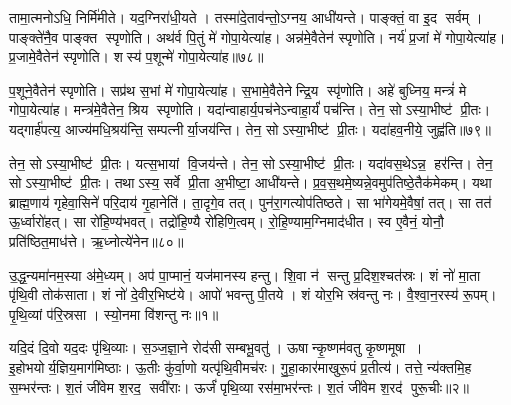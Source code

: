 तामा॒त्मनोऽधि॒ निर्मि॑मीते।
यद॒ग्निरा॑धी॒यते।
तस्मा॑दे॒ताव॑न्तो॒\-ऽग्नय॒ आधी॑यन्ते।
पाङ्क्तं॒ वा इ॒द सर्वम्।
पाङ्क्ते॑नै॒व पाङ्क्त स्पृणोति।
अथ॑र्व पि॒तुं मे॑ गोपा॒येत्या॑ह।
अन्न॑मे॒वैतेन॑ स्पृणोति।
नर्य॑ प्र॒जां मे॑ गोपा॒येत्या॑ह।
प्र॒जामे॒वैतेन॑ स्पृणोति।
शस्य॑ प॒शून्मे॑ गोपा॒येत्या॑ह॥७८॥

प॒शूने॒वैतेन॑ स्पृणोति।
सप्र॑थ स॒भां मे॑ गोपा॒येत्या॑ह।
स॒भामे॒वैतेनेन्द्रि॒य स्पृ॑णोति।
अहे॑ बुध्निय॒ मन्त्रं॑ मे गोपा॒येत्या॑ह।
मन्त्र॑मे॒वैतेन॒ श्रिय स्पृणोति।
यदा॑न्वाहार्य॒पच॑नेऽन्वाहा॒र्यं॑ पच॑न्ति।
तेन॒ सोऽस्या॒भीष्ट॑ प्री॒तः।
यद्गार्\mbox{}ह॑पत्य॒ आज्य॑मधि॒श्रय॑न्ति॒ सम्पत्नीर्या॒जय॑न्ति।
तेन॒ सोऽस्या॒भीष्ट॑ प्री॒तः।
यदा॑हव॒नीये॒ जुह्व॑ति॥७९॥

तेन॒ सोऽस्या॒भीष्ट॑ प्री॒तः।
यत्स॒भायां वि॒जय॑न्ते।
तेन॒ सोऽस्या॒भीष्ट॑ प्री॒तः।
यदा॑वस॒थेऽन्न॒ हर॑न्ति।
तेन॒ सोऽस्या॒भीष्ट॑ प्री॒तः।
तथाऽस्य॒ सर्वे प्री॒ता अ॒भीष्टा॒ आधी॑यन्ते।
प्र॒व॒स॒थमे॒ष्यन्ने॒वमुप॑तिष्ठे॒तैक॑मेकम्।
यथा ब्राह्म॒णाय॑ गृहेवा॒सिने॑ परि॒दाय॑ गृ॒हानेति॑।
ता॒दृगे॒व तत्।
पुन॑रा॒गत्योप॑तिष्ठते।
सा भा॑गेयमे॒वैषां॒ तत्।
सा तत॑ ऊ॒र्ध्वारो॑हत्।
सा रो॑हि॒ण्य॑भवत्।
तद्रो॑हि॒ण्यै रो॑हिणि॒त्वम्।
रो॒हि॒ण्याम॒ग्निमाद॑धीत।
स्व ए॒वैनं॒ योनौ॒ प्रति॑ष्ठित॒माध॑त्ते।
ऋ॒ध्नोत्ये॑नेन॥८०॥\anuvakamend[ए॒षा प॒शून्मे॑ गोपा॒येति॒ प्रवि॑ष्टा प॒शून्मे॑ गोपा॒येत्या॑ह॒ जुह्व॑ति तिष्ठते स॒प्त च॑]





\clearpage
{}
\setcounter{anuvakam}{0}

उ॒द्ध॒न्यमा॑नम॒स्या अ॑मे॒ध्यम्।
अप॑ पा॒प्मानं॒ यज॑मानस्य हन्तु।
शि॒वा न॑ सन्तु प्र॒दिश॒श्चत॑स्रः।
शं नो॑ मा॒ता पृ॑थि॒वी तोक॑साता।
शं नो॑ दे॒वीर॒भिष्ट॑ये।
आपो॑ भवन्तु पी॒तये।
शं योर॒भि स्र॑वन्तु नः।
वै॒श्वा॒न॒रस्य॑ रू॒पम्।
पृ॒थि॒व्यां प॑रि॒स्रसा।
स्यो॒नमा वि॑शन्तु नः॥१॥

यदि॒दं दि॒वो यद॒दः पृ॑थि॒व्याः।
स॒ञ्ज॒ज्ञा॒ने रोद॑सी सम्बभू॒वतु॑।
ऊषान्कृ॒ष्णम॑वतु कृ॒ष्णमूषा।
इ॒होभयोर्य॒ज्ञिय॒माग॑मिष्ठाः।
ऊ॒तीः कु॑र्वा॒णो यत्पृ॑थि॒वीमच॑रः।
गु॒हा॒कार॑माखुरू॒पं प्र॒तीत्य॑।
तत्ते॒ न्य॑क्तमि॒ह स॒म्भर॑न्तः।
श॒तं जी॑वेम श॒रद॒ सवी॑राः।
ऊर्जं॑ पृथि॒व्या रस॑मा॒भर॑न्तः।
श॒तं जी॑वेम श॒रद॑ पुरू॒चीः॥२॥

